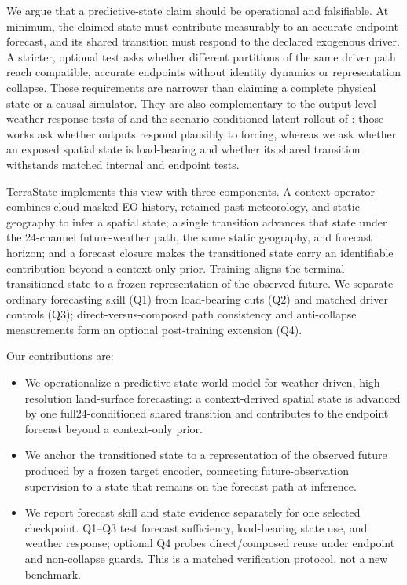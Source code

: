 \documentclass[letterpaper]{article} %
\begin{document}
We argue that a predictive-state claim should be operational and falsifiable.
At minimum, the claimed state must contribute measurably to an accurate
endpoint forecast, and its shared transition must respond to the declared
exogenous driver. A stricter, optional test asks whether different partitions
of the same driver path reach compatible, accurate endpoints without identity
dynamics or representation collapse. These requirements are narrower than
claiming a complete physical state or a causal simulator. They are also
complementary to the output-level weather-response tests of
\citet{luo2026eowm} and the scenario-conditioned latent rollout of
\citet{iele2026vegsim}: those works ask whether outputs respond plausibly to
forcing, whereas we ask whether an exposed spatial state is load-bearing and
whether its shared transition withstands matched internal and endpoint tests.

TerraState implements this view with three components. A context operator
combines cloud-masked EO history, retained past meteorology, and static
geography to infer a spatial state; a single transition advances that state
under the 24-channel future-weather path, the same static geography, and
forecast horizon; and a forecast closure makes the transitioned state carry an
identifiable contribution beyond a context-only prior. Training aligns the
terminal transitioned state to a frozen representation of the observed future.
We separate ordinary forecasting skill (Q1) from load-bearing cuts (Q2) and
matched driver controls (Q3); direct-versus-composed path consistency and
anti-collapse measurements form an optional post-training extension (Q4).

Our contributions are:
\begin{itemize}
    \item We operationalize a predictive-state world model for weather-driven,
    high-resolution land-surface forecasting: a context-derived spatial state
    is advanced by one full24-conditioned shared transition and contributes to
    the endpoint forecast beyond a context-only prior.
    \item We anchor the transitioned state to a representation of the observed
    future produced by a frozen target encoder, connecting future-observation
    supervision to a state that remains on the forecast path at inference.
    \item We report forecast skill and state evidence separately for one selected
    checkpoint. Q1--Q3 test forecast sufficiency, load-bearing state use, and
    weather response; optional Q4 probes direct/composed reuse under endpoint
    and non-collapse guards. This is a matched verification protocol, not a new
    benchmark.
\end{itemize}
\end{document}
